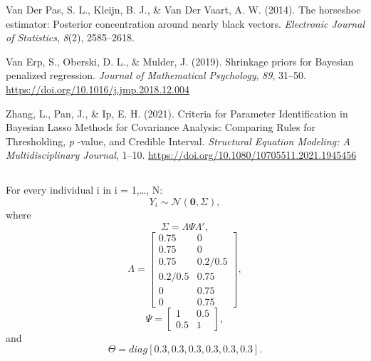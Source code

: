 \documentclass[
  man, donotrepeattitle,floatsintext]{apa6}
\newlength{\cslhangindent}
\newlength{\cslentryspacingunit} %
\newenvironment{CSLReferences}[2] %
 {%
  \setlength{\parindent}{0pt}
  \ifodd #1
  \let\oldpar\par
  \def\par{\hangindent=\cslhangindent\oldpar}
  \fi
  \setlength{\parskip}{#2\cslentryspacingunit}
 }%
 {}
\begin{document}
\begin{CSLReferences}{1}{0}
\leavevmode{}%
Van Der Pas, S. L., Kleijn, B. J., \& Van Der Vaart, A. W. (2014). The horseshoe estimator: {Posterior} concentration around nearly black vectors. \emph{Electronic Journal of Statistics}, \emph{8}(2), 2585--2618.

\leavevmode{}%
Van Erp, S., Oberski, D. L., \& Mulder, J. (2019). Shrinkage priors for {Bayesian} penalized regression. \emph{Journal of Mathematical Psychology}, \emph{89}, 31--50. \url{https://doi.org/10.1016/j.jmp.2018.12.004}

\leavevmode{}%
Zhang, L., Pan, J., \& Ip, E. H. (2021). Criteria for {Parameter} {Identification} in {Bayesian} {Lasso} {Methods} for {Covariance} {Analysis}: {Comparing} {Rules} for {Thresholding}, \emph{p} -value, and {Credible} {Interval}. \emph{Structural Equation Modeling: A Multidisciplinary Journal}, 1--10. \url{https://doi.org/10.1080/10705511.2021.1945456}

\end{CSLReferences}

\endgroup


\clearpage
\makeatletter
\efloat@restorefloats
\makeatother


\begin{appendix}
\section{}
For every individual i in i = 1,\ldots, N:
\[Y_i \sim \mathcal{N}(\mathbf{0}, \Sigma),\] where
\[\Sigma = \Lambda\Psi\Lambda',\] \[\Lambda = 
\begin{bmatrix}
0.75 & 0 \\
0.75 & 0 \\
0.75 & 0.2/0.5 \\
0.2/0.5 & 0.75 \\
0 & 0.75 \\
0 & 0.75
\end{bmatrix},\] \[\Psi =
\begin{bmatrix}
1 & 0.5 \\
0.5 & 1
\end{bmatrix}
,\] and \[\Theta = diag[0.3, 0.3, 0.3, 0.3, 0.3, 0.3].\]
\end{appendix}
\end{document}

